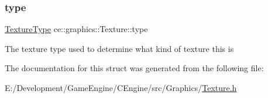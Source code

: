 \subsubsection{\texorpdfstring{type}{type}}
{\footnotesize\ttfamily \hyperlink{_texture_8h_aefaa1df613346ad1fea779bc9a04fdd7}{Texture\+Type} ce\+::graphics\+::\+Texture\+::type}

The texture type used to determine what kind of texture this is 

The documentation for this struct was generated from the following file\+:\begin{DoxyCompactItemize}
\item 
E\+:/\+Development/\+Game\+Engine/\+C\+Engine/src/\+Graphics/\hyperlink{_texture_8h}{Texture.\+h}\end{DoxyCompactItemize}
